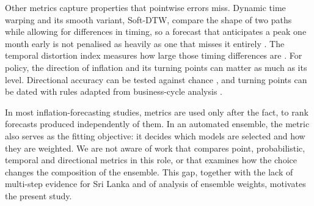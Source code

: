 \documentclass[12pt]{article}
\newcommand{\tbd}[1]{\textcolor{red}{[#1]}}
\begin{document}
Other metrics capture properties that pointwise errors miss. Dynamic time
warping and its smooth variant, Soft-DTW, compare the shape of two paths while
allowing for differences in timing, so a forecast that anticipates a peak one
month early is not penalised as heavily as one that misses it entirely
\citep{sakoe1978, cuturi2017}. The temporal distortion index measures how
large those timing differences are \citep{friasparedes2017, leguen2019}. For
policy, the direction of inflation and its turning points can matter as much
as its level. Directional accuracy can be tested against chance
\citep{pesaran1992}, and turning points can be dated with rules adapted from
business-cycle analysis \citep{harding2002}.

In most inflation-forecasting studies, metrics are used only after the fact,
to rank forecasts produced independently of them. In an automated ensemble,
the metric also serves as the fitting objective: it decides which models are
selected and how they are weighted. We are not aware of work that compares
point, probabilistic, temporal and directional metrics in this role, or that
examines how the choice changes the composition of the ensemble. This gap,
together with the lack of multi-step evidence for Sri Lanka and of analysis
of ensemble weights, motivates the present study.



\end{document}
